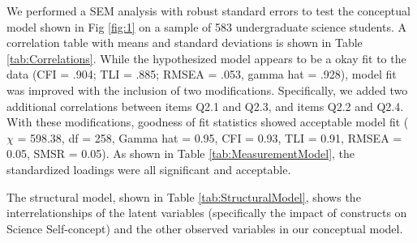 We performed a SEM analysis with robust standard errors to test the conceptual model shown in Fig \ref{fig:1} on a sample of 583 undergraduate science students. A correlation table with means and standard deviations is shown in Table \ref{tab:Correlations}. While the hypothesized model appears to be a okay fit to the data (CFI = .904; TLI = .885;  RMSEA = .053, gamma hat =  .928), model fit was improved with the inclusion of two modifications. Specifically, we added two additional correlations between items Q2.1 and Q2.3, and items Q2.2 and Q2.4. With these modifications, goodness of fit statistics showed acceptable model fit \cite{hu1999cutoff,steiger2007understanding} ($\chi$ = 598.38, df = 258, Gamma hat = 0.95, CFI = 0.93, TLI = 0.91, RMSEA = 0.05, SMSR = 0.05). As shown in Table \ref{tab:MeasurementModel}, the standardized loadings were all significant and acceptable. 

The structural model, shown in Table \ref{tab:StructuralModel}, shows the interrelationships of the latent variables (specifically the impact of constructs on Science Self-concept) and the other observed variables in our conceptual model. 


